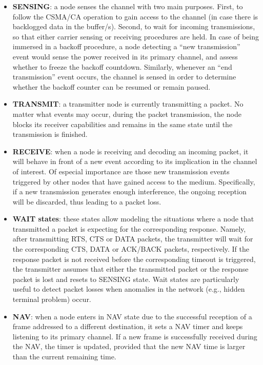 \documentclass{article}
\begin{document}
	\begin{itemize}
		
		\item \textbf{SENSING}: a node senses the channel with two main purposes. First, to follow the CSMA/CA operation to gain access to the channel (in case there is backlogged data in the buffer/s). Second, to wait for incoming transmissions, so that either carrier sensing or receiving procedures are held. In case of being immersed in a backoff procedure, a node detecting a ``new transmission'' event would sense the power received in its primary channel, and assess whether to freeze the backoff countdown. Similarly, whenever an ``end transmission'' event occurs, the channel is sensed in order to determine whether the backoff counter can be resumed or remain paused.
		
		\item \textbf{TRANSMIT}: a transmitter node is currently transmitting a packet. No matter what events may occur, during the packet transmission, the node blocks its receiver capabilities and remains in the same state until the transmission is finished.
		
		\item \textbf{RECEIVE}: when a node is receiving and decoding an incoming packet, it will behave in front of a new event according to its implication in the channel of interest. Of especial importance are those new transmission events triggered by other nodes that have gained access to the medium. Specifically, if a new transmission generates enough interference, the ongoing reception will be discarded, thus leading to a packet loss. 
		
		\item \textbf{WAIT states}: these states allow modeling the situations where a node that transmitted a packet is expecting for the corresponding response. Namely, after transmitting RTS, CTS or DATA packets, the transmitter will wait for the corresponding CTS, DATA or ACK/BACK packets, respectively. If the response packet is not received before the corresponding timeout is triggered, the transmitter assumes that either the transmitted packet or the response packet is lost and resets to SENSING state. Wait states are particularly useful to detect packet losses when anomalies in the network (e.g., hidden terminal problem) occur.
		
		\item \textbf{NAV}: when a node enters in NAV state due to the successful reception of a frame addressed to a different destination, it sets a NAV timer and keeps listening to its primary channel. If a new frame is successfully received during the NAV, the timer is updated, provided that the new NAV time is larger than the current remaining time.
	\end{itemize}
	
\end{document}
